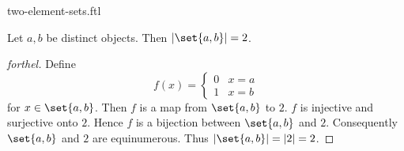 \documentclass{naproche-library}
\begin{document}
\begin{smodule}[title=$2$-Element Sets]{two-element-sets.ftl}

\begin{proposition}[forthel,id=SET_THEORY_07_5465279026954240]
  Let $a, b$ be distinct objects.
  Then $|\set{a,b}| = 2$.
\end{proposition}
\begin{proof}[forthel]
  Define \[ f(x) =
    \begin{cases}
      0 & x = a
      \\
      1 & x = b
    \end{cases} \]
  for $x \in \set{a,b}$.
  Then $f$ is a map from $\set{a,b}$ to $2$.
  $f$ is injective and surjective onto $2$.
  Hence $f$ is a bijection between $\set{a,b}$ and $2$.
  Consequently $\set{a,b}$ and $2$ are equinumerous.
  Thus $|\set{a,b}| = |2| = 2$.
\end{proof}
\end{smodule}
\end{document}
